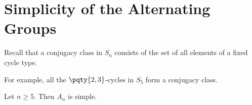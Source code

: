\section{Simplicity of the Alternating Groups}

Recall that a conjugacy class in \(S_n\) consists of the set of all elements of a fixed cycle type.

\begin{example}
    For example, all the \(\pqty{2, 3}\)-cycles in \(S_5\) form a conjugacy class.
\end{example}

\begin{theorem}
    \label{thm:an-simple}%
    Let \(n \geq 5\). Then \(A_n\) is simple.
\end{theorem}

